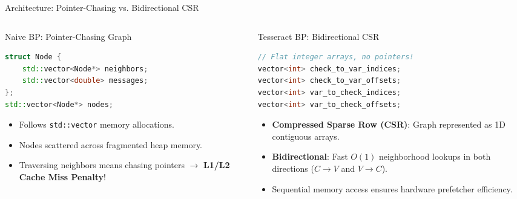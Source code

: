 \begin{frame}[fragile]{Architecture: Pointer-Chasing vs. Bidirectional CSR}
    \begin{columns}[T]
        \begin{column}{0.5\textwidth}
            \begin{block}{\textcolor{googlered}{Naive BP}: Pointer-Chasing Graph}
                \tiny
                \begin{lstlisting}[language=C++]
struct Node {
    std::vector<Node*> neighbors;
    std::vector<double> messages;
};
std::vector<Node*> nodes;
                \end{lstlisting}
                \normalsize
                \begin{itemize}
                    \item Follows \texttt{std::vector} memory allocations.
                    \item Nodes scattered across fragmented heap memory.
                    \item Traversing neighbors means chasing pointers $\rightarrow$ \textbf{L1/L2 Cache Miss Penalty}!
                \end{itemize}
            \end{block}
        \end{column}
        
        \begin{column}{0.5\textwidth}
            \begin{block}{\textcolor{googlegreen}{Tesseract BP}: Bidirectional CSR}
                \tiny
                \begin{lstlisting}[language=C++]
// Flat integer arrays, no pointers!
vector<int> check_to_var_indices;
vector<int> check_to_var_offsets;
vector<int> var_to_check_indices;
vector<int> var_to_check_offsets;
                \end{lstlisting}
                \normalsize
                \begin{itemize}
                    \item \textbf{Compressed Sparse Row (CSR)}: Graph represented as 1D contiguous arrays.
                    \item \textbf{Bidirectional}: Fast $O(1)$ neighborhood lookups in both directions ($C \rightarrow V$ and $V \rightarrow C$).
                    \item Sequential memory access ensures hardware prefetcher efficiency.
                \end{itemize}
            \end{block}
        \end{column}
    \end{columns}
\end{frame}

